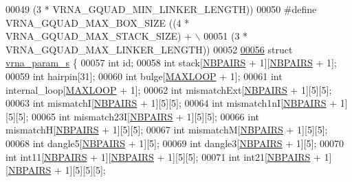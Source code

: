 \begin{DoxyCode}
00049 \textcolor{preprocessor}{                                         (3 * VRNA\_GQUAD\_MIN\_LINKER\_LENGTH))}
00050 \textcolor{preprocessor}{#define   VRNA\_GQUAD\_MAX\_BOX\_SIZE       ((4 * VRNA\_GQUAD\_MAX\_STACK\_SIZE) + \(\backslash\)}
00051 \textcolor{preprocessor}{                                         (3 * VRNA\_GQUAD\_MAX\_LINKER\_LENGTH))}
00052 
\hyperlink{group__energy__parameters}{00056} \textcolor{keyword}{struct }\hyperlink{group__energy__parameters_structvrna__param__s}{vrna\_param\_s} \{
00057   \textcolor{keywordtype}{int}       id;
00058   \textcolor{keywordtype}{int}       stack[\hyperlink{energy__const_8h_a5e75221c779d618eab81e096f37e32ce}{NBPAIRS} + 1][\hyperlink{energy__const_8h_a5e75221c779d618eab81e096f37e32ce}{NBPAIRS} + 1];
00059   \textcolor{keywordtype}{int}       hairpin[31];
00060   \textcolor{keywordtype}{int}       bulge[\hyperlink{energy__const_8h_ad1bd6eabac419670ddd3c9ed82145988}{MAXLOOP} + 1];
00061   \textcolor{keywordtype}{int}       internal\_loop[\hyperlink{energy__const_8h_ad1bd6eabac419670ddd3c9ed82145988}{MAXLOOP} + 1];
00062   \textcolor{keywordtype}{int}       mismatchExt[\hyperlink{energy__const_8h_a5e75221c779d618eab81e096f37e32ce}{NBPAIRS} + 1][5][5];
00063   \textcolor{keywordtype}{int}       mismatchI[\hyperlink{energy__const_8h_a5e75221c779d618eab81e096f37e32ce}{NBPAIRS} + 1][5][5];
00064   \textcolor{keywordtype}{int}       mismatch1nI[\hyperlink{energy__const_8h_a5e75221c779d618eab81e096f37e32ce}{NBPAIRS} + 1][5][5];
00065   \textcolor{keywordtype}{int}       mismatch23I[\hyperlink{energy__const_8h_a5e75221c779d618eab81e096f37e32ce}{NBPAIRS} + 1][5][5];
00066   \textcolor{keywordtype}{int}       mismatchH[\hyperlink{energy__const_8h_a5e75221c779d618eab81e096f37e32ce}{NBPAIRS} + 1][5][5];
00067   \textcolor{keywordtype}{int}       mismatchM[\hyperlink{energy__const_8h_a5e75221c779d618eab81e096f37e32ce}{NBPAIRS} + 1][5][5];
00068   \textcolor{keywordtype}{int}       dangle5[\hyperlink{energy__const_8h_a5e75221c779d618eab81e096f37e32ce}{NBPAIRS} + 1][5];
00069   \textcolor{keywordtype}{int}       dangle3[\hyperlink{energy__const_8h_a5e75221c779d618eab81e096f37e32ce}{NBPAIRS} + 1][5];
00070   \textcolor{keywordtype}{int}       int11[\hyperlink{energy__const_8h_a5e75221c779d618eab81e096f37e32ce}{NBPAIRS} + 1][\hyperlink{energy__const_8h_a5e75221c779d618eab81e096f37e32ce}{NBPAIRS} + 1][5][5];
00071   \textcolor{keywordtype}{int}       int21[\hyperlink{energy__const_8h_a5e75221c779d618eab81e096f37e32ce}{NBPAIRS} + 1][\hyperlink{energy__const_8h_a5e75221c779d618eab81e096f37e32ce}{NBPAIRS} + 1][5][5][5];

\end{DoxyCode}
